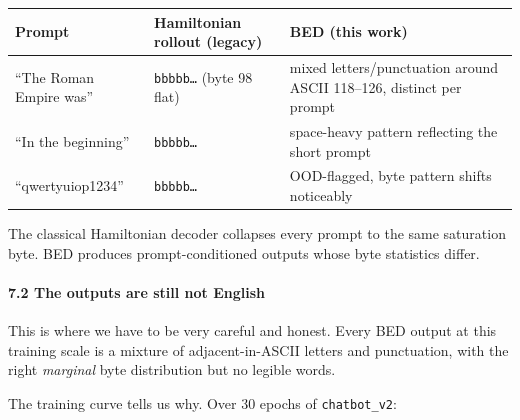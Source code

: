 \documentclass[
  11pt,
  a4paper,
]{article}
\begin{document}
\begin{longtable}[]{@{}
  >{\raggedright\arraybackslash}p{}
  >{\raggedright\arraybackslash}p{}
  >{\raggedright\arraybackslash}p{}@{}}
\toprule\noalign{}
\begin{minipage}[b]{\linewidth}\raggedright
Prompt
\end{minipage} & \begin{minipage}[b]{\linewidth}\raggedright
Hamiltonian rollout (legacy)
\end{minipage} & \begin{minipage}[b]{\linewidth}\raggedright
BED (this work)
\end{minipage} \\
\midrule\noalign{}
\endhead
\bottomrule\noalign{}
\endlastfoot
``The Roman Empire was'' & \texttt{bbbbb…} (byte 98 flat) & mixed
letters/punctuation around ASCII 118--126, distinct per prompt \\
``In the beginning'' & \texttt{bbbbb…} & space-heavy pattern reflecting
the short prompt \\
``qwertyuiop1234'' & \texttt{bbbbb…} & OOD-flagged, byte pattern shifts
noticeably \\
\end{longtable}

The classical Hamiltonian decoder collapses every prompt to the same
saturation byte. BED produces prompt-conditioned outputs whose byte
statistics differ.

\paragraph{7.2 The outputs are still not
English}\label{the-outputs-are-still-not-english}

This is where we have to be very careful and honest. Every BED output at
this training scale is a mixture of adjacent-in-ASCII letters and
punctuation, with the right \emph{marginal} byte distribution but no
legible words.

The training curve tells us why. Over 30 epochs of \texttt{chatbot\_v2}:
\end{document}
